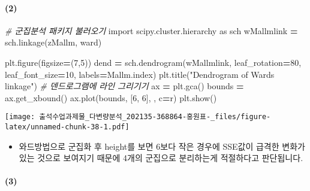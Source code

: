 \documentclass[
]{article}
\newenvironment{Shaded}{\begin{snugshade}}{\end{snugshade}}
\newcommand{\CommentTok}[1]{\textcolor[rgb]{0.56,0.35,0.01}{\textit{#1}}}
\newcommand{\DecValTok}[1]{\textcolor[rgb]{0.00,0.00,0.81}{#1}}
\newcommand{\ImportTok}[1]{#1}
\newcommand{\NormalTok}[1]{#1}
\newcommand{\OperatorTok}[1]{\textcolor[rgb]{0.81,0.36,0.00}{\textbf{#1}}}
\newcommand{\StringTok}[1]{\textcolor[rgb]{0.31,0.60,0.02}{#1}}
\providecommand{\tightlist}{%
  \setlength{\itemsep}{0pt}\setlength{\parskip}{0pt}}
\begin{document}
\hypertarget{section-16}{%
\paragraph{(2)}\label{section-16}}

\begin{Shaded}
\begin{Highlighting}[]
\CommentTok{\# 군집분석 패키지 불러오기}
\ImportTok{import}\NormalTok{ scipy.cluster.hierarchy }\ImportTok{as}\NormalTok{ sch}
\NormalTok{wMallmlink }\OperatorTok{=}\NormalTok{ sch.linkage(zMallm, }\StringTok{\textquotesingle{}ward\textquotesingle{}}\NormalTok{)}

\NormalTok{plt.figure(figsize}\OperatorTok{=}\NormalTok{(}\DecValTok{7}\NormalTok{,}\DecValTok{5}\NormalTok{))}
\NormalTok{dend }\OperatorTok{=}\NormalTok{ sch.dendrogram(wMallmlink, leaf\_rotation}\OperatorTok{=}\DecValTok{80}\NormalTok{, leaf\_font\_size}\OperatorTok{=}\DecValTok{10}\NormalTok{, labels}\OperatorTok{=}\NormalTok{Mallm.index)}
\NormalTok{plt.title(}\StringTok{"Dendrogram of Ward\textquotesingle{}s linkage"}\NormalTok{)}
\CommentTok{\# 덴드로그램에 라인 그리기기}
\NormalTok{ax }\OperatorTok{=}\NormalTok{ plt.gca() }
\NormalTok{bounds }\OperatorTok{=}\NormalTok{ ax.get\_xbound() }
\NormalTok{ax.plot(bounds, [}\DecValTok{6}\NormalTok{, }\DecValTok{6}\NormalTok{], }\StringTok{\textquotesingle{}{-}{-}\textquotesingle{}}\NormalTok{, c}\OperatorTok{=}\StringTok{\textquotesingle{}r\textquotesingle{}}\NormalTok{)}
\NormalTok{plt.show()}
\end{Highlighting}
\end{Shaded}

\texttt{[image: 출석수업과제물\_다변량분석\_202135-368864-홍원표-\_files/figure-latex/unnamed-chunk-38-1.pdf]}

\begin{itemize}
\tightlist
\item
  와드방법으로 군집화 후 height를 보면 6보다 작은 경우에 SSE값이 급격한
  변화가 있는 것으로 보여지기 때문에 4개의 군집으로 분리하는게
  적절하다고 판단됩니다.
\end{itemize}

\hypertarget{section-17}{%
\paragraph{(3)}\label{section-17}}
\end{document}
